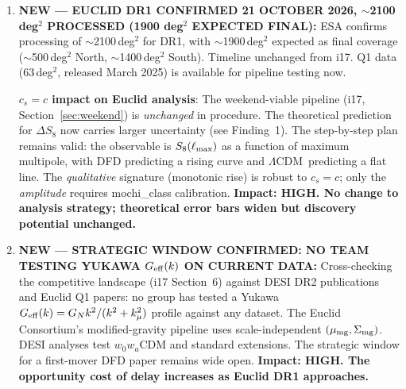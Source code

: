 \documentclass[11pt,a4paper]{article}
\newcommand{\LCDM}{$\Lambda$CDM}
\newcommand{\kmu}{k_\mu}
\newcommand{\Geff}{G_{\rm eff}}
\begin{document}
\begin{findbox}
\begin{enumerate}
  \textbf{SNe needed for detection} (Section~\ref{sec:rubin}):
  $3\sigma$: $\sim$3,000 SNe~Ia with well-measured distances ($z < 0.5$,
  spectroscopic confirmation). $5\sigma$: $\sim$8,000 SNe~Ia.
  Rubin Year~1 will yield $\sim$10,000--50,000 spectroscopically typed
  SNe~Ia (depending on follow-up resources), making $5\sigma$ detection
  feasible within the first year.
  \textbf{Impact: HIGH. Rubin Year~1 can independently test DFD's
  psi-screen anisotropy at $\geq 5\sigma$.}

\item \textbf{NEW --- EUCLID DR1 CONFIRMED 21 OCTOBER 2026, $\sim$2100
  deg$^2$ PROCESSED (1900 deg$^2$ EXPECTED FINAL):}
  ESA confirms processing of $\sim$2100\,deg$^2$ for DR1, with
  $\sim$1900\,deg$^2$ expected as final coverage ($\sim$500\,deg$^2$
  North, $\sim$1400\,deg$^2$ South). Timeline unchanged from i17.
  Q1 data (63\,deg$^2$, released March 2025) is available for pipeline
  testing now.

  \textbf{$c_s = c$ impact on Euclid analysis}: The weekend-viable
  pipeline (i17, Section~\ref{sec:weekend}) is \emph{unchanged} in
  procedure. The theoretical prediction for $\Delta S_8$ now carries
  larger uncertainty (see Finding~1). The step-by-step plan remains
  valid: the observable is $S_8(\ell_{\rm max})$ as a function of
  maximum multipole, with DFD predicting a rising curve and \LCDM\
  predicting a flat line. The \emph{qualitative} signature (monotonic
  rise) is robust to $c_s = c$; only the \emph{amplitude} requires
  mochi\_class calibration.
  \textbf{Impact: HIGH. No change to analysis strategy; theoretical
  error bars widen but discovery potential unchanged.}

\item \textbf{NEW --- STRATEGIC WINDOW CONFIRMED: NO TEAM TESTING
  YUKAWA $\Geff(k)$ ON CURRENT DATA:}
  Cross-checking the competitive landscape (i17 Section~6) against
  DESI DR2 publications and Euclid Q1 papers: no group has tested
  a Yukawa $\Geff(k) = G_N k^2/(k^2 + \kmu^2)$ profile against
  any dataset. The Euclid Consortium's modified-gravity pipeline
  uses scale-independent $(\mu_{\rm mg}, \Sigma_{\rm mg})$. DESI
  analyses test $w_0 w_a$CDM and standard extensions. The strategic
  window for a first-mover DFD paper remains wide open.
  \textbf{Impact: HIGH. The opportunity cost of delay increases as
  Euclid DR1 approaches.}

\end{enumerate}
\end{findbox}
\end{document}
